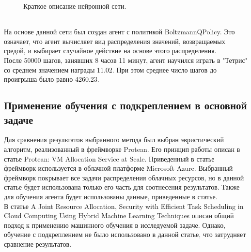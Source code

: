 \documentclass{article}
\begin{document}
\begin{figure}[h]
\caption{Краткое описание нейронной сети.}
\label{ris:image}
\end{figure}\\
На основе данной сети был создан агент с политикой BoltzmannQPolicy. Это означает, что агент вычисляет вид распределения значений, возвращаемых средой, и выбирает случайное действие на основе этого распределения.\\
После 50000 шагов, занявших 8 часов 11 минут, агент научился играть в "Тетрис" со среднем значением награды 11.02. При этом среднее число шагов до проигрыша было равно 4260.23.\\
\newpage
\begin{center}
\item\subsection{Применение обучения с подкреплением в основной задаче}
\end{center}
Для сравнения результатов выбранного метода был выбран эвристический алгоритм, реализованный в фреймворке Protean. Его принцип работы описан в статье Protean: VM Allocation Service at Scale\cite{litlink21}. Приведенный в статье фреймворк используется в облачной платформе Microsoft Azure. Выбранный фреймворк покрывает все задачи распределения облачных ресурсов, но в данной статье будет использована только его часть для соотнесения результатов. Также для обучения агента будет использованы данные, приведенные в статье\cite{litlink22}.\\
В статье A Joint Resource Allocation, Security with Efficient Task Scheduling in Cloud Computing Using Hybrid Machine Learning Techniques\cite{litlink23} описан общий подход к применению машинного обучения в исследуемой задаче. Однако, обучение с подкреплением не было использовано в данной статье, что затрудняет сравнение результатов.\\
\end{document}
